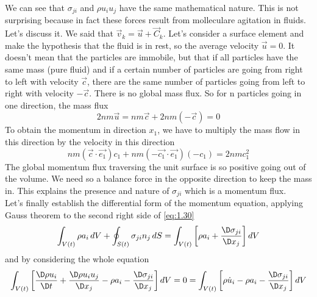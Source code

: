 		\begin{center}
		\end{center}
		We can see that $\sigma _{ji}$ and $\rho u_iu_j$ have the same mathematical nature. This is not surprising because in fact these forces result from molleculare agitation in fluids. Let's discuss it. We said that $\vec{v}_k = \vec{u} + \vec{C}_k$. Let's consider a surface element and make the hypothesis that the fluid is in rest, so the average velocity $\vec{u} = 0$. It doesn't mean that the particles are immobile, but that if all particles have the same mass (pure fluid) and if a certain number of particles are going from right to left with velocity $\vec{c}$, there are the same number of particles going from left to right with velocity $-\vec{c}$. There is no global mass flux. So for n particles going in one direction, the mass flux
		\begin{equation}
			2nm\vec{u} = nm\vec{c} + 2nm(-\vec{c}) = 0 
		\end{equation}
		To obtain the momentum in direction $x_1$, we have to multiply the mass flow in this direction by the velocity in this direction 
		\begin{equation}
			nm (\vec{c}\cdot \vec{e_1})c_1 + nm (-\vec{c_1}\cdot \vec{e_1})(-c_1) = 2nmc_1^2
		\end{equation}
		The global momentum flux traversing the unit surface is so positive going out of the volume. We need so a balance force in the opposite direction to keep the mass in. This explains the presence and nature of $\sigma _{ji}$ which is a momentum flux. \\
	Let's finally establish the differential form of the momentum equation, applying Gauss theorem to the second right side of \eqref{eq:1.30}
	\begin{equation}
		\int _{V(t)} \rho a_i\, dV + \oint _{S(t)} \sigma _{ji} n_j \, dS = \int _{V(t)} \left[ \rho a_i + \frac{\D \sigma _{ji}}{\D x_j} \right] dV
	\end{equation}
	and by considering the whole equation
	\begin{equation}
		\int _{V(t)} \left[ \frac{\D \rho u_i}{\D t} + \frac{\D \rho u_i u_j}{\D x_j} - \rho a_i - \frac{\D \sigma _{ji}}{\D x_j} \right] dV = 0 = \int _{V(t)} \left[ \rho \dot{u}_i - \rho a_i - \frac{\D \sigma _{ji}}{\D x_j} \right] dV
	\end{equation}
